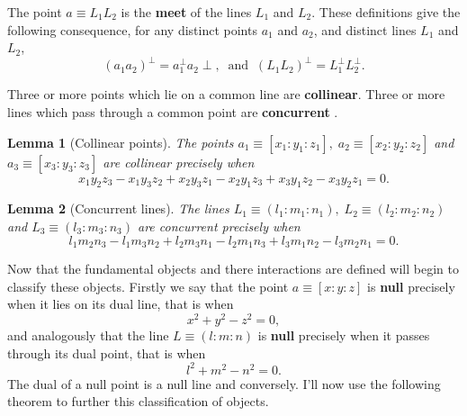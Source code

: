 \documentclass[11pt]{article}
\newtheorem{theorem}{Theorem}
\newtheorem{theorem}{Lemma}
\begin{document}
The point $a\equiv L_{1}L_{2}$ is the \textbf{meet} of the lines $L_{1}$ and 
$L_{2}$. These definitions give the following consequence, for any distinct
points $a_{1}$ and $a_{2}$, and distinct lines $L_{1}$ and $L_{2}$, 
\begin{equation*}
(a_{1}a_{2})^{\perp}=a_{1}^{\perp}a_{2}\perp,\;\;\text{and}%
\;\;(L_{1}L_{2})^{\perp}=L_{1}^{\perp}L_{2}^{\perp}.
\end{equation*}

Three or more points which lie on a common line are \textbf{collinear}.
Three or more lines which pass through a common point are \textbf{concurrent}%
.\newline

\begin{theorem}[Collinear points]
The points $a_{1}\equiv[x_{1}:y_{1}:z_{1}],\; a_{2}\equiv[x_{2}:y_{2}:z_{2}]$
and $a_{3}\equiv[x_{3}:y_{3}:z_{3}]$ are collinear precisely when 
\begin{equation*}
x_{1}y_{2}z_{3}-x_{1}y_{3}z_{2}+x_{2}y_{3}z_{1}-x_{2}y_{1}z_{3}+x_{3}y_{1}z_{2}-x_{3}y_{2}z_{1}=0.
\end{equation*}
\end{theorem}

\begin{theorem}[Concurrent lines]
The lines $L_{1}\equiv(l_{1}:m_{1}:n_{1}),\; L_{2}\equiv(l_{2}:m_{2}:n_{2})$
and $L_{3}\equiv(l_{3}:m_{3}:n_{3})$ are concurrent precisely when 
\begin{equation*}
l_{1}m_{2}n_{3}-l_{1}m_{3}n_{2}+l_{2}m_{3}n_{1}-l_{2}m_{1}n_{3}+l_{3}m_{1}n_{2}-l_{3}m_{2}n_{1}=0.
\end{equation*}
\end{theorem}

Now that the fundamental objects and there interactions are defined will
begin to classify these objects. Firstly we say that the point $a\equiv[x:y:z%
]$ is \textbf{null} precisely when it lies on its dual line, that is when 
\begin{equation*}
x^{2}+y^{2}-z^{2}=0,
\end{equation*}
and analogously that the line $L\equiv(l:m:n)$ is \textbf{null} precisely
when it passes through its dual point, that is when 
\begin{equation*}
l^{2}+m^{2}-n^{2}=0.
\end{equation*}
The dual of a null point is a null line and conversely. I'll now use the
following theorem to further this classification of objects.\newline
\end{document}
